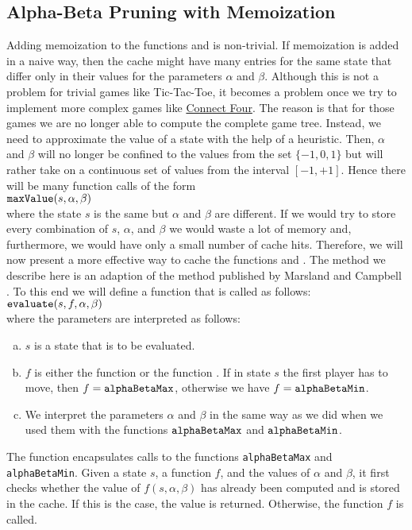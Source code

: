 \subsection{Alpha-Beta Pruning with Memoization}
Adding memoization to the functions  and  is non-trivial.
If memoization is added in a naive way, then the cache might have many entries for the same state that differ
only in their values for the parameters $\alpha$ and $\beta$.  Although this is not a problem for trivial games
like Tic-Tac-Toe, it becomes a problem once we try to implement more complex games like
\href{https://en.wikipedia.org/wiki/Connect_Four}{Connect Four}. The reason is that for those games we are no
longer able to compute the complete game tree.  Instead, we need to approximate the value of a state with the
help of a heuristic.  Then, $\alpha$ and $\beta$ will no longer be confined to the values from the set
$\{-1,0,1\}$ but will rather take on a continuous set of values from the interval $[-1, +1]$.  Hence there will
be many function calls of the form 
\\[0.2cm]
\hspace*{1.3cm}
$\texttt{maxValue}(s, \alpha, \beta)$ 
\\[0.2cm]
where the state $s$ is the same but $\alpha$ and $\beta$ are different.  If we would try to store every
combination of $s$, $\alpha$, and $\beta$ we would waste a lot of memory and, furthermore, we would have only a
small number of cache hits.  Therefore, we will now present a more effective way to cache the functions
 and .  The method we describe here is an adaption of the method published by
Marsland and Campbell \cite{marsland:82}.
To this end we will define a function  that is
called as follows:
\\[0.2cm]
\hspace*{1.3cm}
$\texttt{evaluate}(s, f, \alpha, \beta)$
\\[0.2cm]
where the parameters are interpreted as follows:
\begin{enumerate}[(a)]
\item $s$ is a state that is to be evaluated.
\item $f$ is either the function  or the function .
      If in state $s$ the first player has to move, then $f = \texttt{alphaBetaMax}$, otherwise we have
      $f = \texttt{alphaBetaMin}$.
\item We interpret the parameters $\alpha$ and $\beta$ in the same way as we did when we used them with
      the functions $\texttt{alphaBetaMax}$ and $\texttt{alphaBetaMin}$.
\end{enumerate}
The function  encapsulates calls to the functions \texttt{alphaBetaMax} and
\texttt{alphaBetaMin}.  Given a state $s$, a function $f$, and the values of $\alpha$ and $\beta$, 
it first checks whether the value of $f(s, \alpha, \beta)$ has already been computed and is stored in the
cache.  If this is the case, the value is returned.  Otherwise, the function $f$ is called.  

